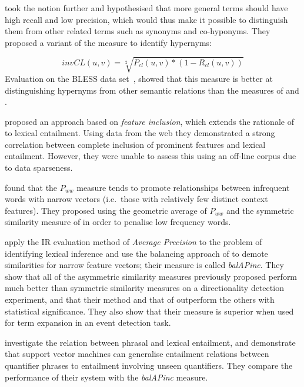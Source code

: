 \documentclass[11pt]{article}
\begin{document}
 took the notion further and hypothesised that more general terms should have high recall and low precision, which would thus make it possible to distinguish them from other related terms such as synonyms and co-hyponyms.  They proposed a variant of the  measure to identify hypernyms:

\[
invCL(u,v) = \sqrt[2]{P_{cl}(u,v)*(1-R_{cl}(u,v))}
\]
Evaluation on the BLESS data set~\cite{Baroni2011}, showed that this measure is  better at distinguishing hypernyms from other semantic relations than the measures of  and .

 proposed an approach based on \emph{feature inclusion}, which extends the rationale of~ to lexical entailment. Using data from the web they demonstrated a strong correlation between complete inclusion of prominent features and lexical entailment. However, they were unable to assess this using an off-line corpus due to data sparseness.

 found that the $P_{ww}$ measure tends to promote relationships between infrequent words with narrow vectors (i.e.~those with relatively few distinct context features).  They proposed using the geometric average of $P_{ww}$ and the symmetric similarity measure of  in order to penalise low frequency words.   

 apply the IR evaluation method of \emph{Average Precision} to the problem of identifying lexical inference and use the balancing approach of  to demote similarities for narrow feature vectors; their measure is called \emph{balAPinc}.  They show that all of the asymmetric similarity measures previously proposed perform much better than symmetric similarity measures on a directionality detection experiment, and that their method and that of  outperform the others with statistical significance. They also show that their measure is superior when used for term expansion in an event detection task.

 investigate the relation between phrasal and
lexical entailment, and demonstrate that support vector machines can
generalise entailment relations between quantifier phrases to
entailment involving unseen quantifiers. They compare the performance
of their system with the \emph{balAPinc} measure.
\end{document}
